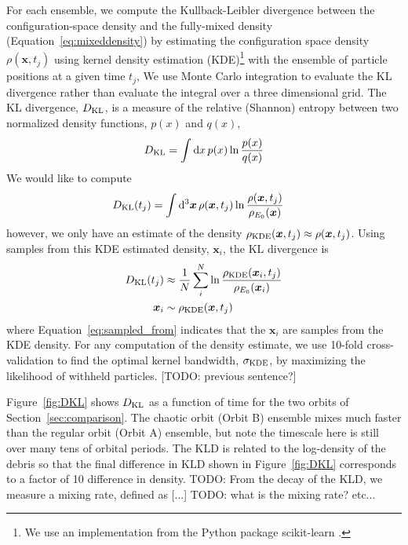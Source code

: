 \documentclass[letterpaper,12pt,preprint]{aastex}
\newcommand{\dd}{\mathrm{d}}
\newcommand{\bs}[1]{\boldsymbol{#1}}
\begin{document}
For each ensemble, we compute the Kullback-Leibler divergence \citep[KL divergence;][]{kullback51} between the configuration-space density and the fully-mixed density (Equation~\ref{eq:mixeddensity}) by estimating the configuration space density $\rho(\bs{x},t_j)$ using kernel density estimation (KDE)\footnote{We use an implementation from the Python package scikit-learn \citep{scikitlearn}.} with the ensemble of particle positions at a given time $t_j$, We use Monte Carlo integration to evaluate the KL divergence rather than evaluate the integral over a three dimensional grid. The KL divergence, $D_{\rm KL}$, is a measure of the relative (Shannon) entropy between two normalized density functions, $p(x)$ and $q(x)$,
\begin{equation}
	D_{\rm KL} = \int \dd x \, p(x) \ln \frac{p(x)}{q(x)}
\end{equation}
We would like to compute 
\begin{align}
	D_{\rm KL}(t_j) &= \int \dd^3 \bs{x} \, \rho(\bs{x},t_j) \ln \frac{\rho(\bs{x},t_j)}{\rho_{E_0}(\bs{x})}
\end{align}
however, we only have an estimate of the density $\rho_{\rm KDE}(\bs{x},t_j) \approx \rho(\bs{x},t_j)$. Using samples from this KDE estimated density, $\bs{x}_i$, the KL divergence is
\begin{align}
	D_{\rm KL}(t_j) &\approx \frac{1}{N} \sum_i^N \ln \frac{\rho_{\rm KDE}(\bs{x}_i,t_j)}{\rho_{E_0}(\bs{x}_i)}\\
	\bs{x}_i &\sim \rho_{\rm KDE}(\bs{x},t_j)\label{eq:sampled_from}
\end{align}
where Equation~\ref{eq:sampled_from} indicates that the $\bs{x}_i$ are samples from the KDE density. For any computation of the density estimate, we use 10-fold cross-validation to find the optimal kernel bandwidth, $\sigma_{\rm KDE}$, by maximizing the likelihood of withheld particles. [TODO: previous sentence?]

Figure~\ref{fig:DKL} shows $D_{\rm KL}$ as a function of time for the two orbits of Section~\ref{sec:comparison}. The chaotic orbit (Orbit B) ensemble mixes much faster than the regular orbit (Orbit A) ensemble, but note the timescale here is still over many tens of orbital periods. The KLD is related to the log-density of the debris so that the final difference in KLD shown in Figure~\ref{fig:DKL} corresponds to a factor of 10 difference in density. TODO: From the decay of the KLD, we measure a mixing rate, defined as [...] TODO: what is the mixing rate? etc...
\end{document}

